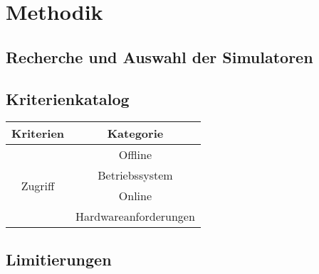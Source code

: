 \chapter{Methodik}

\section{Recherche und Auswahl der Simulatoren}

\section{Kriterienkatalog}

\begin{center}
\begin{tabular}{|c|c|}
\hline
\textbf{Kriterien} & \textbf{Kategorie} \\
\hline
\multirow{4}{*}{Zugriff} & Offline \\
                         & Betriebssystem \\
                         & Online \\
                         & Hardwareanforderungen \\
\hline 
\end{tabular}
\end{center}

\section{Limitierungen}
